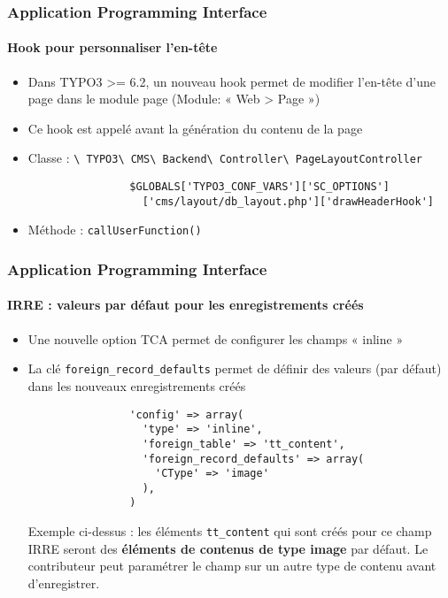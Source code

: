 \begin{frame}[fragile]
	\frametitle{Application Programming Interface}
	\framesubtitle{Hook pour personnaliser l'en-tête}

	\begin{itemize}
		\item Dans TYPO3 >= 6.2, un nouveau hook permet de modifier l'en-tête d'une page dans le module page (Module: « Web > Page »)
		\item Ce hook est appelé avant la génération du contenu de la page
		\item Classe :\newline
			\smaller
				\texttt{\textbackslash
					TYPO3\textbackslash
					CMS\textbackslash
					Backend\textbackslash
					Controller\textbackslash
					PageLayoutController}\normalsize

			\lstset{
				basicstyle=\smaller\ttfamily
			}

			\begin{lstlisting}
				$GLOBALS['TYPO3_CONF_VARS']['SC_OPTIONS']
				  ['cms/layout/db_layout.php']['drawHeaderHook']
			\end{lstlisting}

		\item Méthode :\newline
			\smaller
				\texttt{callUserFunction()}

	\end{itemize}

\end{frame}


\begin{frame}[fragile]
	\frametitle{Application Programming Interface}
	\framesubtitle{IRRE : valeurs par défaut pour les enregistrements créés}

	\begin{itemize}
		\item Une nouvelle option TCA permet de configurer les champs « inline »
		\item La clé \texttt{foreign\_record\_defaults} permet de définir des valeurs (par défaut) dans les nouveaux enregistrements créés

			\begin{lstlisting}
				'config' => array(
				  'type' => 'inline',
				  'foreign_table' => 'tt_content',
				  'foreign_record_defaults' => array(
				    'CType' => 'image'
				  ),
				)
			\end{lstlisting}

			\small
				Exemple ci-dessus : les éléments \texttt{tt\_content} qui sont créés pour ce champ IRRE seront des \textbf{éléments de contenus de type image} par défaut.\newline
				Le contributeur peut paramétrer le champ sur un autre type de contenu avant d'enregistrer.
			\normalsize
	\end{itemize}

\end{frame}


